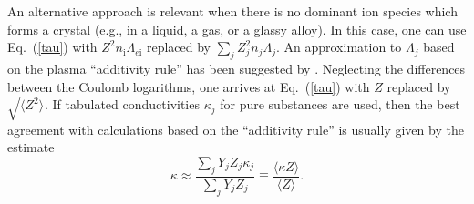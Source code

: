 \documentclass[smallextended]{svjour3}       %
\newcommand{\beq}{\begin{equation}}
\newcommand{\eeq}{\end{equation}}
\newcommand{\nion}{n_\mathrm{i}}
\newcommand{\req}[1]{Eq.~(\ref{#1})}
\begin{document}
\begin{appendix}
An alternative approach is relevant when there is no
dominant ion species  which forms a crystal (e.g., in a
liquid, a gas, or a glassy alloy). In this case, one can use
\req{tau} with $Z^2 \nion \Lambda_{e\mathrm{i}}$ replaced by
$\sum_j Z_j^2 n_j \Lambda_j$. An approximation to
$\Lambda_j$ based on the plasma  ``additivity rule'' has
been suggested by \citet{Potekhin-ea99}. Neglecting the
differences between the Coulomb logarithms, one arrives at
\req{tau} with $Z$ replaced by $\sqrt{\langle Z^2\rangle}$. If tabulated
conductivities $\kappa_j$ for pure substances are used, then
the best agreement with calculations based on the
``additivity rule'' is usually given by the estimate
\beq
   \kappa \approx \frac{\sum_j Y_j Z_j \kappa_j }{
        \sum_j Y_j Z_j}
 \equiv \frac{\langle \kappa Z \rangle }{ \langle Z \rangle}.
\eeq



\end{appendix}
\end{document}

